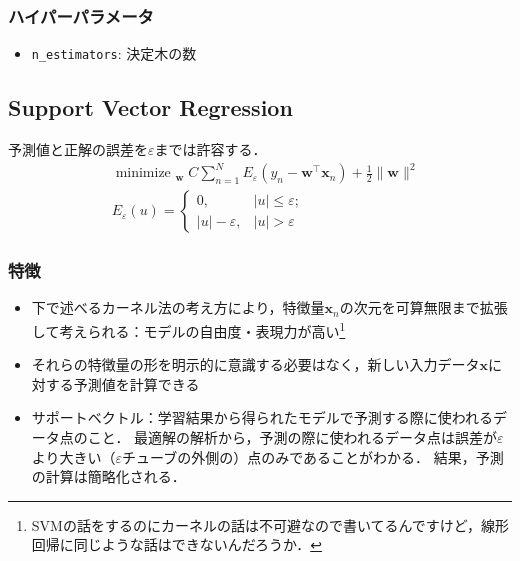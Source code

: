 \documentclass[a4paper,lualatex,ja=standard,oneside,fleqn]{bxjsarticle}
\DeclareMathOperator*{\minimize}{minimize\ }
\begin{document}
\subsubsection*{ハイパーパラメータ}
\begin{itemize}
  \item \verb|n_estimators|: 決定木の数
\end{itemize}

\subsection{Support Vector Regression}
予測値と正解の誤差を$\varepsilon$までは許容する．
\begin{align*}
  &\minimize_{\bm{w}} C\sum_{n=1}^NE_\varepsilon(y_n-\bm{w}^\top\bm{x}_n) + \frac{1}{2}\|\bm{w}\|^2\\
  &E_\varepsilon(u) = \begin{cases}
    0, & |u|\leq\varepsilon;\\
    |u|-\varepsilon, & |u|>\varepsilon
  \end{cases}
\end{align*}

\subsubsection*{特徴}
\begin{itemize}
  \item 下で述べるカーネル法の考え方により，特徴量$\bm{x}_n$の次元を可算無限まで拡張して考えられる：モデルの自由度・表現力が高い\footnote{SVMの話をするのにカーネルの話は不可避なので書いてるんですけど，線形回帰に同じような話はできないんだろうか．}
  \item それらの特徴量の形を明示的に意識する必要はなく，新しい入力データ$\bm{x}$に対する予測値を計算できる
  \item サポートベクトル：学習結果から得られたモデルで予測する際に使われるデータ点のこと．
  最適解の解析から，予測の際に使われるデータ点は誤差が$\varepsilon$より大きい（$\varepsilon$チューブの外側の）点のみであることがわかる．
  結果，予測の計算は簡略化される．
\end{itemize}
\end{document}
